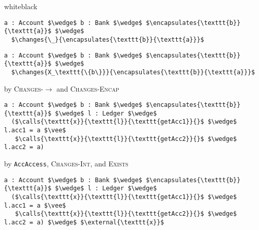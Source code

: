 \begin{proofBox}{white}{black}
\footnotesize
\begin{minipage}{0.75\textwidth}
\begin{lstlisting}[language = Chainmail, mathescape=true, frame=single]
a : Account $\wedge$ b : Bank $\wedge$ $\encapsulates{\texttt{b}}{\texttt{a}}$ $\wedge$ 
  $\changes{\_}{\encapsulates{\texttt{b}}{\texttt{a}}}$
\end{lstlisting}
\end{minipage}
\begin{minipage}{0.24\textwidth}
\end{minipage}
\begin{minipage}{0.75\textwidth}
\begin{lstlisting}[language = Chainmail, mathescape=true]
a : Account $\wedge$ b : Bank $\wedge$ $\encapsulates{\texttt{b}}{\texttt{a}}$ $\wedge$ 
  $\changes{X_\texttt{\{b\}}}{\encapsulates{\texttt{b}}{\texttt{a}}}$
\end{lstlisting}
\end{minipage}
\begin{minipage}{0.24\textwidth}
\scriptsize
\hfill by \textsc{Changes}-$\longrightarrow$ and \textsc{Changes-Encap}
\end{minipage}
\begin{minipage}{0.75\textwidth}
\begin{lstlisting}[language = Chainmail, mathescape=true]
a : Account $\wedge$ b : Bank $\wedge$ $\encapsulates{\texttt{b}}{\texttt{a}}$ $\wedge$ l : Ledger $\wedge$ 
  ($\calls{\texttt{x}}{\texttt{l}}{\texttt{getAcc1}}{}$ $\wedge$ l.acc1 = a $\vee$ 
   $\calls{\texttt{x}}{\texttt{l}}{\texttt{getAcc2}}{}$ $\wedge$ l.acc2 = a)
\end{lstlisting}
\end{minipage}
\begin{minipage}{0.24\textwidth}
\scriptsize
\hfill by \texttt{AccAccess}, \textsc{Changes-Int}, and \textsc{Exists}
\end{minipage}
\begin{minipage}{0.75\textwidth}
\begin{lstlisting}[language = Chainmail, mathescape=true]
a : Account $\wedge$ b : Bank $\wedge$ $\encapsulates{\texttt{b}}{\texttt{a}}$ $\wedge$ l : Ledger $\wedge$ 
  ($\calls{\texttt{x}}{\texttt{l}}{\texttt{getAcc1}}{}$ $\wedge$ l.acc1 = a $\vee$ 
   $\calls{\texttt{x}}{\texttt{l}}{\texttt{getAcc2}}{}$ $\wedge$ l.acc2 = a) $\wedge$ $\external{\texttt{x}}$
\end{lstlisting}

\end{minipage}
\end{proofBox}
